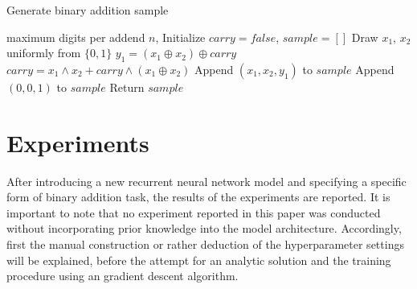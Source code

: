 \documentclass{article}
\begin{document}
\begin{algorithm}[tb]
   \caption{Generate binary addition sample}
   \label{alg:binary-addition}
\begin{algorithmic}
    maximum digits per addend $n$, 
   \STATE Initialize $carry = false$, $sample = []$
   \STATE Draw $x_1$, $x_2$ uniformly from $\{0, 1\}$
   \STATE $y_1 = (x_1 \oplus x_2) \oplus carry$
   \STATE $carry = x_1 \land x_2 + carry \land (x_1 \oplus x_2)$
   \STATE Append $(x_1, x_2, y_1)$ to $sample$
   \ENDFOR
   \STATE Append $(0,0,1)$ to $sample$
   \ENDIF
   \STATE Return $sample$
\end{algorithmic}
\end{algorithm}

\section{Experiments}

After introducing a new recurrent neural network model and specifying a specific form of binary addition task, the results of the experiments are reported. It is important to note that no experiment reported in this paper was conducted without incorporating prior knowledge into the model architecture. Accordingly, first the manual construction or rather deduction of the hyperparameter settings will be explained, before the attempt for an analytic solution and the training procedure using an gradient descent algorithm.


\end{document}

